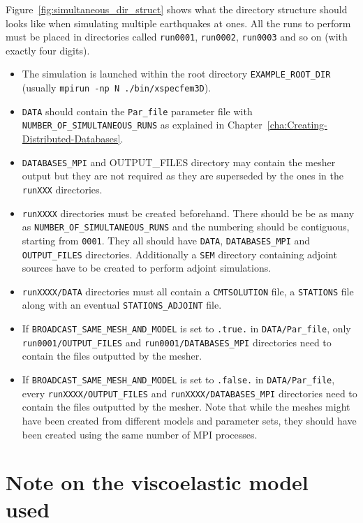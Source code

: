 Figure~\ref{fig:simultaneous_dir_struct} shows what the directory structure
should looks like when simulating multiple earthquakes at ones.
All the runs to perform must be placed in directories called \texttt{run0001}, \texttt{run0002}, \texttt{run0003} and so on (with exactly four digits).

\begin{itemize}
\item The simulation is launched within the root directory \texttt{EXAMPLE\_ROOT\_DIR}\\
(usually \texttt{mpirun -np N ./bin/xspecfem3D}).
\item \texttt{DATA} should contain the \texttt{Par\_file} parameter file with
\texttt{NUMBER\_OF\_SIMULTANEOUS\_RUNS} as explained in Chapter~\ref{cha:Creating-Distributed-Databases}.
\item \texttt{DATABASES\_MPI} and {OUTPUT\_FILES} directory may contain the mesher output but they
are not required as they are superseded by the ones in the \texttt{runXXX} directories.
\item \texttt{runXXXX} directories must be created beforehand. There should be be as many as
\texttt{NUMBER\_OF\_SIMULTANEOUS\_RUNS} and the numbering should be contiguous, starting from \texttt{0001}.
They all should have \texttt{DATA},
\texttt{DATABASES\_MPI} and \texttt{OUTPUT\_FILES} directories. Additionally a \texttt{SEM} directory
containing adjoint sources have to be created to perform adjoint simulations.
\item \texttt{runXXXX/DATA} directories must all contain a \texttt{CMTSOLUTION} file,
a \texttt{STATIONS} file along with an eventual \texttt{STATIONS\_ADJOINT} file.
\item If \texttt{BROADCAST\_SAME\_MESH\_AND\_MODEL} is set to \texttt{.true.} in \texttt{DATA/Par\_file},
only \texttt{run0001/OUTPUT\_FILES} and \texttt{run0001/DATABASES\_MPI} directories need to contain the files
outputted by the mesher.
\item If \texttt{BROADCAST\_SAME\_MESH\_AND\_MODEL} is set to \texttt{.false.} in \texttt{DATA/Par\_file},
every \texttt{runXXXX/OUTPUT\_FILES} and \texttt{runXXXX/DATABASES\_MPI} directories need to contain the files
outputted by the mesher. Note that while the meshes might have been created from different models and
parameter sets, they should have been created using the same number of MPI processes.
\end{itemize}


\section{Note on the viscoelastic model used}

